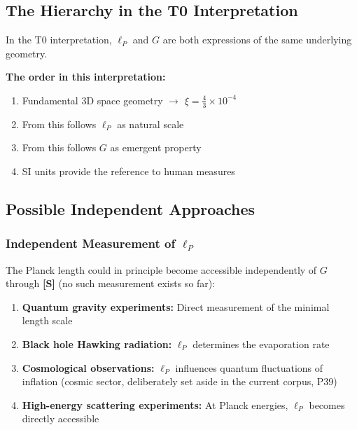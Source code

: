 	\subsection{The Hierarchy in the T0 Interpretation}
	
	\begin{tcolorbox}[colback=green!5!white,colframe=green!75!black,title=Interpretation in the T0 Framework]
		In the T0 interpretation, $\ell_P$ and $G$ are both expressions of the same underlying geometry.
		
		\textbf{The order in this interpretation:}
		\begin{enumerate}
			\item Fundamental 3D space geometry $\rightarrow$ $\xi = \frac{4}{3} \times 10^{-4}$
			\item From this follows $\ell_P$ as natural scale
			\item From this follows $G$ as emergent property  
			\item SI units provide the reference to human measures
		\end{enumerate}
	\end{tcolorbox}
	
	\subsection{Possible Independent Approaches}
	
	\subsubsection{Independent Measurement of $\ell_P$}
	
	The Planck length could in principle become accessible independently of $G$ through \textbf{[S]} (no such measurement exists so far):
	
	\begin{enumerate}
		\item \textbf{Quantum gravity experiments:} Direct measurement of the minimal length scale
		\item \textbf{Black hole Hawking radiation:} $\ell_P$ determines the evaporation rate
		\item \textbf{Cosmological observations:} $\ell_P$ influences quantum fluctuations of inflation (cosmic sector, deliberately set aside in the current corpus, P39)
		\item \textbf{High-energy scattering experiments:} At Planck energies, $\ell_P$ becomes directly accessible
	\end{enumerate}
	
